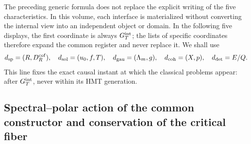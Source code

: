 The preceding generic formula does not replace the explicit writing of the five characteristics. In this volume, each interface is materialized without converting the internal view into an independent object or domain. In the following five displays, the first coordinate is always $\mathfrak G_T^{\rm int}$; the lists of specific coordinates therefore expand the common register and never replace it. We shall use
\[
 d_{\rm sp}=(R,\mathcal D_R^{\rm cof}),\quad
 d_{\rm sol}=(u_0,f,T),\quad
 d_{\rm gau}=(\Lambda_m,g),\quad
 d_{\rm coh}=(X,p),\quad
 d_{\rm det}=E/\mathbb Q.
\]
This line fixes the exact causal instant at which the classical problems appear:
after \(\mathfrak G_T^{\rm int}\), never within its HMT generation.

\subsection{Spectral–polar action of the common constructor and conservation of the critical fiber}


